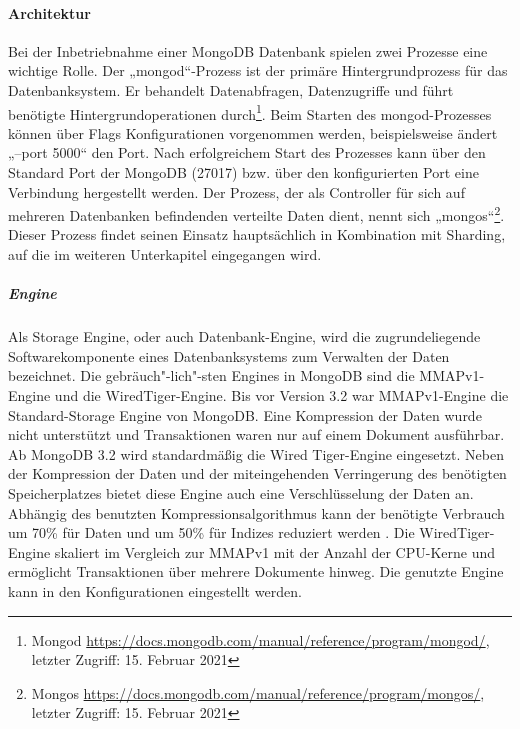 \paragraph{Architektur}
Bei der Inbetriebnahme einer MongoDB Datenbank spielen zwei Prozesse eine wichtige  Rolle. \newline Der  „mongod“-Prozess ist der primäre Hintergrundprozess für das Datenbanksystem. Er behandelt Datenabfragen, Datenzugriffe und führt benötigte Hintergrundoperationen durch\footnote{Mongod \url{https://docs.mongodb.com/manual/reference/program/mongod/}, letzter Zugriff: 15. Februar 2021}. Beim Starten des mongod-Prozesses können über Flags Konfigurationen vorgenommen werden, beispielsweise ändert „--port 5000“ den Port. Nach erfolgreichem Start des Prozesses kann über den Standard Port der MongoDB (27017) bzw. über den konfigurierten Port eine Verbindung hergestellt werden.\newline
Der Prozess, der als Controller für sich auf mehreren Datenbanken befindenden verteilte Daten dient, nennt sich „mongos“\footnote{Mongos \url{https://docs.mongodb.com/manual/reference/program/mongos/}, letzter Zugriff: 15. Februar 2021}. Dieser Prozess findet seinen Einsatz hauptsächlich in Kombination mit Sharding, auf die im weiteren Unterkapitel eingegangen wird. \newline

\noindent
\subparagraph{Engine}
Als Storage Engine, oder auch Datenbank-Engine, wird die zugrundeliegende Softwarekomponente eines Datenbanksystems zum Verwalten der Daten bezeichnet. Die gebräuch"-lich"-sten Engines in MongoDB sind die MMAPv1-Engine und die WiredTiger-Engine.\newline
Bis vor Version 3.2 war MMAPv1-Engine die Standard-Storage Engine von MongoDB. Eine Kompression der Daten wurde nicht unterstützt und Transaktionen waren nur auf einem Dokument ausführbar. Ab MongoDB 3.2 wird standardmäßig die Wired Tiger-Engine eingesetzt. Neben der Kompression der Daten und der miteingehenden Verringerung des benötigten Speicherplatzes bietet diese Engine auch eine Verschlüsselung der Daten an. Abhängig des benutzten Kompressionsalgorithmus kann der benötigte Verbrauch um 70\% für Daten und um 50\% für Indizes reduziert werden \cite{DB3.5}. Die WiredTiger-Engine skaliert im Vergleich zur MMAPv1 mit der Anzahl der CPU-Kerne und ermöglicht Transaktionen über mehrere Dokumente hinweg. Die genutzte Engine kann in den Konfigurationen eingestellt werden.
\newline

